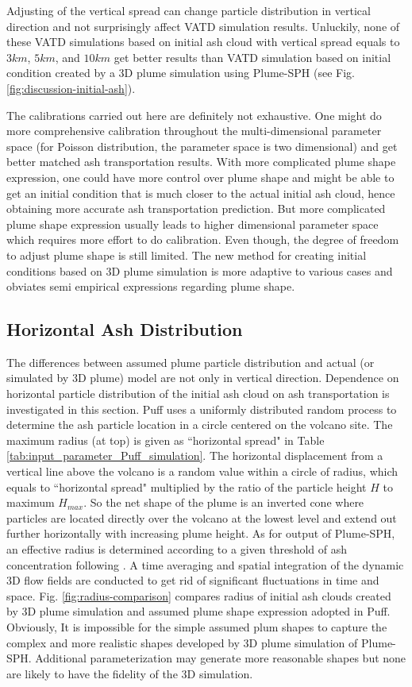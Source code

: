 \documentclass[utf8]{frontiersSCNS} %
\begin{document}
Adjusting of the vertical spread can change particle distribution in vertical direction and not surprisingly affect VATD simulation results. Unluckily, none of these VATD simulations based on initial ash cloud with vertical spread equals to $3km$, $5km$, and $10 km$ get better results than VATD simulation based on initial condition created by a 3D plume simulation using Plume-SPH (see Fig. \ref{fig:discussion-initial-ash}).

The calibrations carried out here are definitely not exhaustive. One might do more comprehensive calibration throughout the multi-dimensional parameter space (for Poisson distribution, the parameter space is two dimensional) and get better matched ash transportation results. With more complicated plume shape expression, one could have more control over plume shape and might be able to get an initial condition that is much closer to the actual initial ash cloud, hence obtaining more accurate ash transportation prediction. But more complicated plume shape expression usually leads to higher dimensional parameter space which requires more effort to do calibration. Even though, the degree of freedom to adjust plume shape is still limited. The new method for creating initial conditions based on 3D plume simulation is more adaptive to various cases and obviates semi empirical expressions regarding plume shape.

\subsection{Horizontal Ash Distribution}

The differences between assumed plume particle distribution and actual (or simulated by 3D plume) model are not only in vertical direction. Dependence on horizontal particle distribution of the initial ash cloud on ash transportation is investigated in this section. Puff uses a uniformly distributed random process to determine the ash particle location in a circle centered on the volcano site. The maximum radius (at top) is given as ``horizontal spread" in Table \ref{tab:input_parameter_Puff_simulation}. The horizontal displacement from a vertical line above the volcano is a random value within a circle of radius, which equals to ``horizontal spread" multiplied by the ratio of the particle height $H$ to maximum $H_{max}$. So the net shape of the plume is an inverted cone where particles are located directly over the volcano at the lowest level and extend out further horizontally with increasing plume height. As for output of Plume-SPH, an effective radius is determined according to a given threshold of ash concentration following \citet {cerminara2016large}. A time averaging and spatial integration of the dynamic 3D flow fields are conducted to get rid of significant fluctuations in time and space. Fig. \ref{fig:radius-comparison} compares radius of initial ash clouds created by 3D plume simulation and assumed plume shape expression adopted in Puff. Obviously, It is impossible for the simple assumed plum shapes to capture the complex and more realistic shapes developed by 3D plume simulation of Plume-SPH. Additional parameterization may generate more reasonable shapes but none are likely to have the fidelity of the 3D simulation.
\end{document}
